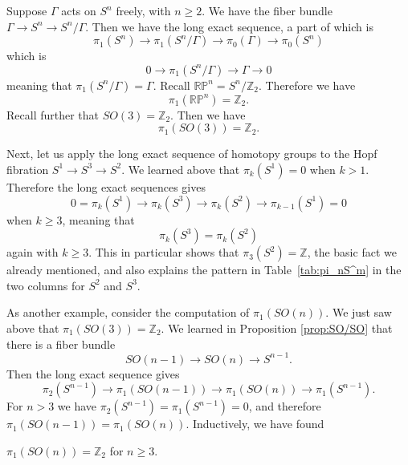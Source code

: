 \documentclass[12pt]{article}
\numberwithin{equation}{section}
\def\bZ{\mathbb{Z}}
\def\RP{\mathbb{RP}}
\begin{document}
Suppose $\Gamma$ acts on $S^n$ freely, with $n\ge 2$. 
We have the fiber bundle $\Gamma\to S^n\to S^n/\Gamma$.
Then we have the long exact sequence, a part of which is \begin{equation}
  \pi_1(S^n) \to \pi_1(S^n/\Gamma)\to \pi_0(\Gamma) \to \pi_0(S^n)
\end{equation} which is \begin{equation}
   0 \to \pi_1(S^n/\Gamma) \to \Gamma\to 0
\end{equation} meaning that $\pi_1(S^n/\Gamma)=\Gamma$.
Recall $\RP^n=S^n/\bZ_2$. Therefore we have \begin{equation}
  \pi_1(\RP^n)=\bZ_2.
\end{equation}
Recall further that $SO(3)=\bZ_2$. Then we have \begin{equation}
  \pi_1(SO(3))=\bZ_2.
\end{equation}

Next, let us apply the long exact sequence of homotopy groups to the Hopf fibration $S^1\to S^3\to S^2$.
We learned above that $\pi_k(S^1)=0$ when $k>1$.
Therefore the long exact sequences gives \begin{equation}
  0=\pi_{k}(S^1)\to \pi_{k}(S^3)\to \pi_k(S^2)\to \pi_{k-1}(S^1)=0
\end{equation} when $k\ge 3$, meaning that \begin{equation}
  \pi_k(S^3)=\pi_k(S^2)
\end{equation} again with $k\ge 3$. 
This in particular shows that $\pi_3(S^2)=\bZ$, the basic fact we already mentioned,
and also explains the pattern in Table~\ref{tab:pi_nS^m}
in the two columns for $S^2$ and $S^3$.

As another example, consider the computation of $\pi_1(SO(n))$.
We just saw above that $\pi_1(SO(3))=\bZ_2$.
We learned in Proposition \ref{prop:SO/SO} that there is a fiber bundle
\begin{equation}
SO(n-1)\to SO(n)\to S^{n-1}.
\end{equation} Then the long exact sequence gives
\begin{equation}
  \pi_2(S^{n-1})\to \pi_1(SO(n-1))\to \pi_1(SO(n))\to \pi_1(S^{n-1}).
\end{equation}
For $n>  3$ we have $\pi_{2}(S^{n-1})=\pi_1(S^{n-1})=0$, and therefore $\pi_1(SO(n-1))=\pi_1(SO(n))$.
Inductively, we have found 
\begin{example}
  \label{ex:pi1SOn}
$\pi_1(SO(n))=\bZ_2$ for $n\ge 3$.
\end{example}
\end{document}
